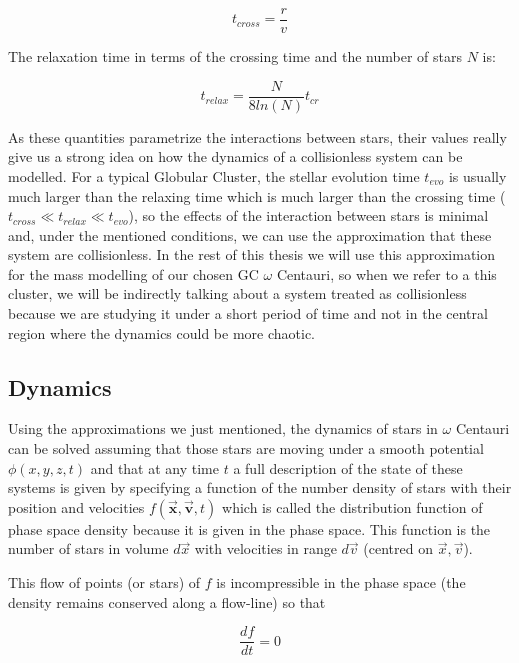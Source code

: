 \begin{equation}
t_{cross}=\frac{r}{v}
\end{equation}

The relaxation time in terms of the crossing time and the number of stars $N$ is:

\begin{equation}
t_{relax}=\frac{N}{8ln(N)}t_{cr}
\end{equation}

As these quantities parametrize the interactions between stars, their values really give us a strong idea on how the dynamics of a collisionless system can be modelled. For a typical Globular Cluster, the stellar evolution time $t_{evo}$ is usually much larger than the relaxing time which is much larger than the crossing time ($t_{cross}\ll t_{relax}\ll t_{evo}$), so the effects of the interaction between stars is minimal and, under the mentioned conditions, we can use the approximation that these system are collisionless. In the rest of this thesis we will use this approximation for the mass modelling of our chosen GC $\omega$ Centauri, so when we refer to a this cluster, we will be indirectly talking about a system treated as collisionless because we are studying it under a short period of time and not in the central region where the dynamics could be more chaotic.

\subsection{Dynamics}

Using the approximations we just mentioned, the dynamics of stars in $\omega$ Centauri can be solved assuming that those stars are moving under a smooth potential $\phi (x,y,z,t)$ and that at any time $t$ a full description of the state of these systems is given by specifying a function of the number density of stars with their position and velocities $f(\vec{\textbf{x}},\vec{\textbf{v}},t)$ which is called the distribution function of phase space density because it is given in the phase space. This function is the number of stars in volume $d\vec{x}$ with velocities in range $d\vec{v}$ (centred on $\vec{x},\vec{v}$).

This flow of points (or stars) of $f$ is incompressible in the phase space (the density remains conserved along a flow-line) so that

\begin{equation}
\frac{df}{dt}=0
\end{equation}

